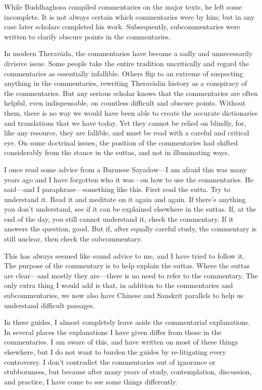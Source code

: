 \documentclass[12pt,openany]{book}%
\begin{document}
While Buddhaghosa compiled commentaries on the major texts, he left some incomplete. It is not always certain which commentaries were by him; but in any case later scholars completed his work. Subsequently, subcommentaries were written to clarify obscure points in the commentaries.

In modern \textsanskrit{Theravāda}, the commentaries have become a sadly and unnecessarily divisive issue. Some people take the entire tradition uncritically and regard the commentaries as essentially infallible. Others flip to an extreme of suspecting anything in the commentaries, rewriting \textsanskrit{Theravādin} history as a conspiracy of the commentaries. But any serious scholar knows that the commentaries are often helpful, even indispensable, on countless difficult and obscure points. Without them, there is no way we would have been able to create the accurate dictionaries and translations that we have today. Yet they cannot be relied on blindly, for, like any resource, they are fallible, and must be read with a careful and critical eye. On some doctrinal issues, the position of the commentaries had shifted considerably from the stance in the suttas, and not in illuminating ways.

I once read some advice from a Burmese Sayadaw—I am afraid this was many years ago and I have forgotten who it was—on how to use the commentaries. He said—and I paraphrase—something like this. First read the sutta. Try to understand it. Read it and meditate on it again and again. If there’s anything you don’t understand, see if it can be explained elsewhere in the suttas. If, at the end of the day, you still cannot understand it, check the commentary. If it answers the question, good. But if, after equally careful study, the commentary is still unclear, then check the subcommentary.

This has always seemed like sound advice to me, and I have tried to follow it. The purpose of the commentary is to help explain the suttas. Where the suttas are clear—and mostly they are—there is no need to refer to the commentary. The only extra thing I would add is that, in addition to the commentaries and subcommentaries, we now also have Chinese and Sanskrit parallels to help us understand difficult passages.

In these guides, I almost completely leave aside the commentarial explanations. In several places the explanations I have given differ from those in the commentaries. I am aware of this, and have written on most of these things elsewhere, but I do not want to burden the guides by re-litigating every controversy. I don’t contradict the commentaries out of ignorance or stubbornness, but because after many years of study, contemplation, discussion, and practice, I have come to see some things differently.
\end{document}
